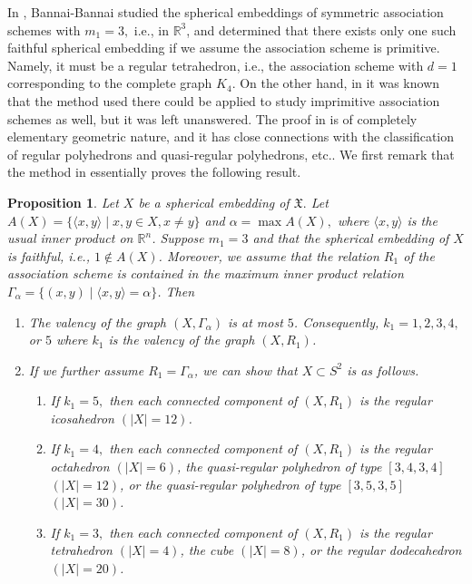 \documentclass[12pt]{amsart}
\newtheorem{proposition}[theorem]{Proposition}
\begin{document}
In \cite{MR2212140}, Bannai-Bannai studied the spherical embeddings of symmetric association 
schemes with $m_1=3,$ i.e., in $\mathbb R^3$, and determined that there exists only one such faithful spherical 
embedding if we assume the association scheme is primitive. Namely, it must be a regular tetrahedron, i.e., the association scheme with $d=1$ corresponding to the complete 
graph $K_4$. On the other hand, in \cite{MR2212140} it was known that the method used there 
could be applied to study imprimitive association schemes as well, but it was left unanswered. 
The proof in \cite{MR2212140} is of completely elementary geometric nature, and it has close 
connections with the classification of regular polyhedrons and quasi-regular 
polyhedrons, etc.. We first remark that the method in \cite{MR2212140} 
essentially proves the following result.




\begin{proposition} \label{pro:Adapter}
	Let $X$ be a spherical embedding of $\mathfrak X.$ 
	Let $A(X)=\{\langle x,y \rangle \mid x,y \in X, x\not= y\}$ 
	and $\alpha =\max A(X),$ where $\langle x,y \rangle$ is 
	the usual inner product on $\mathbb R^n$. 
	Suppose $m_1=3$ and that the spherical embedding of $X$ is faithful, i.e., $1\not\in A(X)$.
	Moreover, we assume that the relation $R_1$ of the association scheme is contained in the maximum inner product relation $\Gamma_\alpha = \{ (x,y) \mid \langle x,y \rangle=\alpha\}$. Then 
	\begin{enumerate}		\item The valency of the graph $(X, \Gamma_\alpha)$ is at most $5$. Consequently, $k_1 =1,2,3,4,$ or $5$ where $k_1$ is the valency of the graph $(X, R_1)$.
		\item If we further assume $R_1 = \Gamma_\alpha$, we can show that $X\subset S^2$ is as follows.
		\begin{enumerate}			\item If $k_1=5,$ then each connected component of $(X,R_1)$ is the regular icosahedron $(|X|=12)$.
			\item If $k_1=4,$ then each connected component of $(X,R_1)$ is the regular octahedron $(|X|=6)$, the quasi-regular polyhedron of type $[3,4,3,4]$ $(|X|=12)$, or the quasi-regular polyhedron of type $[3,5,3,5]$ $(|X|=30)$.
			\item If $k_1=3,$ then each connected component of $(X,R_1)$ is the regular tetrahedron $(|X|=4)$, the cube $(|X|=8)$, or the regular dodecahedron $(|X|=20)$.
		\end{enumerate}
	\end{enumerate}
\end{proposition}
\end{document}
